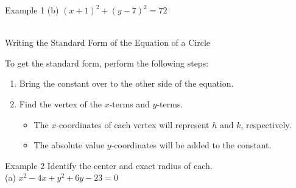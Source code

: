 \documentclass[t]{beamer}
\begin{document}
\begin{frame}{Example 1}
(b)	\quad	$(x+1)^2 + (y-7)^2 = 72$	\newline\\
	\newline\\
 
\end{frame}

\begin{frame}{Writing the Standard Form of the Equation of a Circle}

To get the standard form, perform the following steps:	\newline\\	
\begin{enumerate}
    \item Bring the constant over to the other side of the equation.	\newline\\ \pause
    \item Find the vertex of the $x$-terms and $y$-terms. \newline\\ \pause
        \begin{itemize}
            \item The $x$-coordinates of each vertex will represent $h$ and $k$, respectively.	\newline\\ \pause
            \item The absolute value $y$-coordinates will be added to the constant.
        \end{itemize}
\end{enumerate}
\end{frame}

\begin{frame}{Example 2}
Identify the center and exact radius of each.	\newline\\
(a)	\quad	$x^2-4x+y^2+6y-23=0$	
	\newline\\
	\\
\end{frame}
\end{document}
